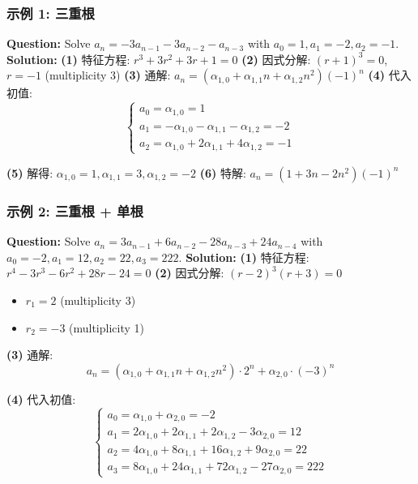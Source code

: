 \documentclass[10pt,a4paper,openany]{ctexbook}
\theoremstyle{definition}
\theoremstyle{remark}
\begin{document}
\vspace{-2pt}

\subsubsection{示例 1: 三重根}

\textbf{Question:} Solve $a_n = -3a_{n-1} - 3a_{n-2} - a_{n-3}$ with $a_0 = 1, a_1 = -2, a_2 = -1$.
\textbf{Solution:}
\textbf{(1)} 特征方程: $r^3 + 3r^2 + 3r + 1 = 0$
\textbf{(2)} 因式分解: $(r+1)^3 = 0$, $r = -1$ (multiplicity 3)
\textbf{(3)} 通解: $a_n = (\alpha_{1,0} + \alpha_{1,1} n + \alpha_{1,2} n^2)(-1)^n$
\textbf{(4)} 代入初值:
\[
\begin{cases}
a_0 = \alpha_{1,0} = 1 \\
a_1 = -\alpha_{1,0} - \alpha_{1,1} - \alpha_{1,2} = -2 \\
a_2 = \alpha_{1,0} + 2\alpha_{1,1} + 4\alpha_{1,2} = -1
\end{cases}
\]

\textbf{(5)} 解得: $\alpha_{1,0} = 1, \alpha_{1,1} = 3, \alpha_{1,2} = -2$
\textbf{(6)} 特解: $a_n = (1 + 3n - 2n^2)(-1)^n$
\vspace{-2pt}

\subsubsection{示例 2: 三重根 + 单根}

\textbf{Question:} Solve $a_n = 3a_{n-1} + 6a_{n-2} - 28a_{n-3} + 24a_{n-4}$ with $a_0 = -2, a_1 = 12, a_2 = 22, a_3 = 222$.
\textbf{Solution:}
\textbf{(1)} 特征方程: $r^4 - 3r^3 - 6r^2 + 28r - 24 = 0$
\textbf{(2)} 因式分解: $(r-2)^3(r+3) = 0$
\begin{itemize}
\item $r_1 = 2$ (multiplicity 3)
\item $r_2 = -3$ (multiplicity 1)

\end{itemize}

\textbf{(3)} 通解:
\[
a_n = (\alpha_{1,0} + \alpha_{1,1} n + \alpha_{1,2} n^2) \cdot 2^n + \alpha_{2,0} \cdot (-3)^n
\]

\textbf{(4)} 代入初值:
\[
\begin{cases}
a_0 = \alpha_{1,0} + \alpha_{2,0} = -2 \\
a_1 = 2\alpha_{1,0} + 2\alpha_{1,1} + 2\alpha_{1,2} - 3\alpha_{2,0} = 12 \\
a_2 = 4\alpha_{1,0} + 8\alpha_{1,1} + 16\alpha_{1,2} + 9\alpha_{2,0} = 22 \\
a_3 = 8\alpha_{1,0} + 24\alpha_{1,1} + 72\alpha_{1,2} - 27\alpha_{2,0} = 222
\end{cases}
\]
\end{document}
